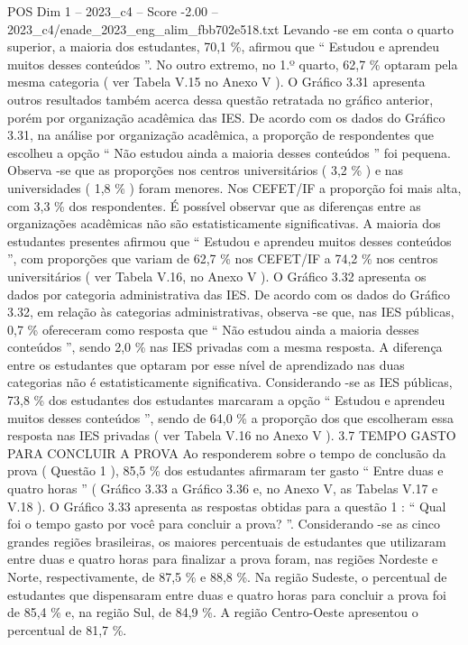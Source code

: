 \begin{textsample}{POS Dim 1 – 2023\_c4 – Score -2.00 – 2023\_c4/enade\_2023\_eng\_alim\_fbb702e518.txt}
Levando -se em conta o quarto superior, a maioria dos estudantes, 70,1 \%, afirmou que “ Estudou e aprendeu muitos desses conteúdos ”.
No outro extremo, no 1.º quarto, 62,7 \% optaram pela mesma categoria ( ver Tabela V.15 no Anexo V ).
O Gráfico 3.31 apresenta outros resultados também acerca dessa questão retratada no gráfico anterior, porém por organização acadêmica das IES.
De acordo com os dados do Gráfico 3.31, na análise por organização acadêmica, a proporção de respondentes que escolheu a opção “ Não estudou ainda a maioria desses conteúdos ” foi pequena.
Observa -se que as proporções nos centros universitários ( 3,2 \% ) e nas universidades ( 1,8 \% ) foram menores.
Nos CEFET/IF a proporção foi mais alta, com 3,3 \% dos respondentes.
É possível observar que as diferenças entre as organizações acadêmicas não são estatisticamente significativas.
A maioria dos estudantes presentes afirmou que “ Estudou e aprendeu muitos desses conteúdos ”, com proporções que variam de 62,7 \% nos CEFET/IF a 74,2 \% nos centros universitários ( ver Tabela V.16, no Anexo V ).
O Gráfico 3.32 apresenta os dados por categoria administrativa das IES.
De acordo com os dados do Gráfico 3.32, em relação às categorias administrativas, observa -se que, nas IES públicas, 0,7 \% ofereceram como resposta que “ Não estudou ainda a maioria desses conteúdos ”, sendo 2,0 \% nas IES privadas com a mesma resposta.
A diferença entre os estudantes que optaram por esse nível de aprendizado nas duas categorias não é estatisticamente significativa.
Considerando -se as IES públicas, 73,8 \% dos estudantes dos estudantes marcaram a opção “ Estudou e aprendeu muitos desses conteúdos ”, sendo de 64,0 \% a proporção dos que escolheram essa resposta nas IES privadas ( ver Tabela V.16 no Anexo V ). 3.7 TEMPO GASTO PARA CONCLUIR A PROVA Ao responderem sobre o tempo de conclusão da prova ( Questão 1 ), 85,5 \% dos estudantes afirmaram ter gasto “ Entre duas e quatro horas ” ( Gráfico 3.33 a Gráfico 3.36 e, no Anexo V, as Tabelas V.17 e V.18 ).
O Gráfico 3.33 apresenta as respostas obtidas para a questão 1 : “ Qual foi o tempo gasto por você para concluir a prova? ”.
Considerando -se as cinco grandes regiões brasileiras, os maiores percentuais de estudantes que utilizaram entre duas e quatro horas para finalizar a prova foram, nas regiões Nordeste e Norte, respectivamente, de 87,5 \% e 88,8 \%.
Na região Sudeste, o percentual de estudantes que dispensaram entre duas e quatro horas para concluir a prova foi de 85,4 \% e, na região Sul, de 84,9 \%.
A região Centro-Oeste apresentou o percentual de 81,7 \%.

\end{textsample}
